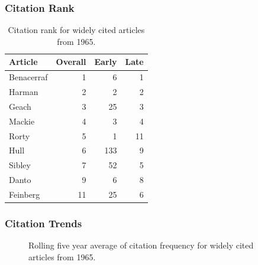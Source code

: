 \documentclass[
  10pt,
  letterpaper,
  DIV=11,
  numbers=noendperiod,
  twoside]{scrartcl}
\begin{document}
\subsubsection*{Citation Rank}\label{sec-rank-1965}

\begin{longtable}[]{@{}lrrr@{}}

\caption{\label{tbl-citation-rank-1965}Citation rank for widely cited
articles from 1965.}

\tabularnewline

\toprule\noalign{}
Article & Overall & Early & Late \\
\midrule\noalign{}
\endhead
\bottomrule\noalign{}
\endlastfoot
Benacerraf & 1 & 6 & 1 \\
Harman & 2 & 2 & 2 \\
Geach & 3 & 25 & 3 \\
Mackie & 4 & 3 & 4 \\
Rorty & 5 & 1 & 11 \\
Hull & 6 & 133 & 9 \\
Sibley & 7 & 52 & 5 \\
Danto & 9 & 6 & 8 \\
Feinberg & 11 & 25 & 6 \\

\end{longtable}

\subsubsection*{Citation Trends}\label{sec-trends-1965}

\begin{figure}


\caption{\label{fig-citation-spaghetti-1965}Rolling five year average of
citation frequency for widely cited articles from 1965.}

\end{figure}%
\end{document}
